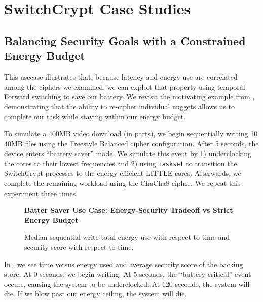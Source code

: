 \section{SwitchCrypt Case Studies}\label{sec:usecases}


\subsection{Balancing Security Goals with a Constrained Energy Budget}

This usecase illustrates that, because latency and energy use are correlated
among the ciphers we examined, we can exploit that property using temporal
Forward switching to save our battery. We revisit the motivating example from
, demonstrating that the ability to re-cipher individual
nuggets allows us to complete our task while staying within our energy budget.

To simulate a 400MB video download (in parts), we begin sequentially writing 10
40MB files using the Freestyle Balanced cipher configuration. After 5 seconds,
the device enters ``battery saver'' mode. We simulate this event by 1)
underclocking the cores to their lowest frequencies and 2) using
\texttt{taskset} to transition the SwitchCrypt processes to the energy-efficient
LITTLE cores. Afterwards, we complete the remaining workload using the ChaCha8
cipher. We repeat this experiment three times.

\begin{figure}[ht] \textbf{Batter Saver Use Case: Energy-Security Tradeoff vs
   Strict Energy Budget}\par\medskip
   \centering
   {} \caption{Median sequential write total
   energy use with respect to time and security score with respect to time.}
  \label{fig:usecase-battery}
\end{figure}

In , we see time versus energy used and average security
score of the backing store. At 0 seconds, we begin writing. At 5 seconds, the
``battery critical'' event occurs, causing the system to be underclocked. At 120
seconds, the system will die. If we blow past our energy ceiling, the system
will die.

